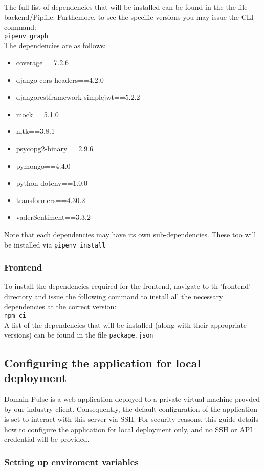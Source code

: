 \documentclass{article}
\newcommand{\code}[1]{\colorbox{light-gray}{\texttt{#1}}}
\begin{document}
The full list of dependencies that will be installed can be found in the the file backend/Pipfile. Furthemore, to see the specific versions you may issue the CLI command:\\
\code{pipenv graph} \\
The dependencies are as follows:
\begin{itemize}
    \item coverage==7.2.6
    \item django-cors-headers==4.2.0
    \item djangorestframework-simplejwt==5.2.2
    \item mock==5.1.0
    \item nltk==3.8.1
    \item psycopg2-binary==2.9.6
    \item pymongo==4.4.0
    \item python-dotenv==1.0.0
    \item transformers==4.30.2
    \item vaderSentiment==3.3.2
\end{itemize}
Note that each dependencies may have its own sub-dependencies. These too will be installed via \code{pipenv install}

\subsubsection{Frontend}
To install the dependencies required for the frontend, navigate to th 'frontend' directory and issue the following command to install
all the necessary dependencies at the correct version: \\
\code{npm ci}\\
A list of the dependencies that will be installed (along with their appropriate versions) can be found in the file \code{package.json}


\subsection{Configuring the application for local deployment}
Domain Pulse is a web application deployed to a private virtual machine provded by our industry client. Consequently, the default
configuration of the application is set to interact with this server via SSH. For security reasons, this guide details how to configure
the application for local deployment only, and no SSH or API credential will be provided.

\subsubsection{Setting up enviroment variables}
\end{document}
